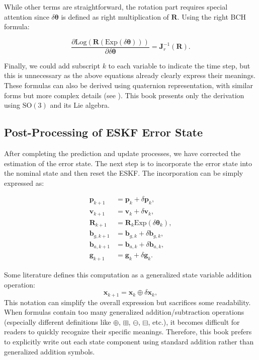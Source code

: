 While other terms are straightforward, the rotation part requires special attention since $\delta \boldsymbol{\theta}$ is defined as right multiplication of $\mathbf{R}$. Using the right BCH formula:

\begin{equation}\label{eq:rotation-derivative}
	\frac{\partial \mathrm{Log} (\mathbf{R}(\mathrm{Exp}(\delta \boldsymbol{\theta})))}{\partial \delta \boldsymbol{\theta}} = \mathbf{J}_r^{-1} (\mathbf{R}).
\end{equation}

Finally, we could add subscript $k$ to each variable to indicate the time step, but this is unnecessary as the above equations already clearly express their meanings. These formulas can also be derived using quaternion representation, with similar forms but more complex details (see \cite{Sola2017}). This book presents only the derivation using $\mathrm{SO}(3)$ and its Lie algebra.
\subsection{Post-Processing of ESKF Error State}
After completing the prediction and update processes, we have corrected the estimation of the error state. The next step is to incorporate the error state into the nominal state and then reset the ESKF. The incorporation can be simply expressed as:

\begin{subequations}\label{eq:error-state-incorporation}
	\begin{align}
		\mathbf{p}_{k+1} &= \mathbf{p}_k + \delta \mathbf{p}_k, \\
		\mathbf{v}_{k+1} &= \mathbf{v}_k + \delta \mathbf{v}_k, \\
		\mathbf{R}_{k+1} &= \mathbf{R}_k \mathrm{Exp}(\delta \boldsymbol{\theta}_k), \\
		\mathbf{b}_{g, k+1} &= \mathbf{b}_{g,k} + \delta \mathbf{b}_{g,k}, \\
		\mathbf{b}_{a, k+1} &= \mathbf{b}_{a,k} + \delta \mathbf{b}_{a,k}, \\
		\mathbf{g}_{k+1} &= \mathbf{g}_{k} + \delta \mathbf{g}_{k}.
	\end{align}
\end{subequations}

Some literature defines this computation as a generalized state variable addition operation:
\begin{equation}\label{eq:generalized-addition}
	\mathbf{x}_{k+1} = \mathbf{x}_k \oplus \delta \mathbf{x}_{k},
\end{equation}
This notation can simplify the overall expression but sacrifices some readability. When formulas contain too many generalized addition/subtraction operations (especially different definitions like $\oplus$, $\boxplus$, $\ominus$, $\boxminus$, etc.), it becomes difficult for readers to quickly recognize their specific meanings. Therefore, this book prefers to explicitly write out each state component using standard addition rather than generalized addition symbols.

